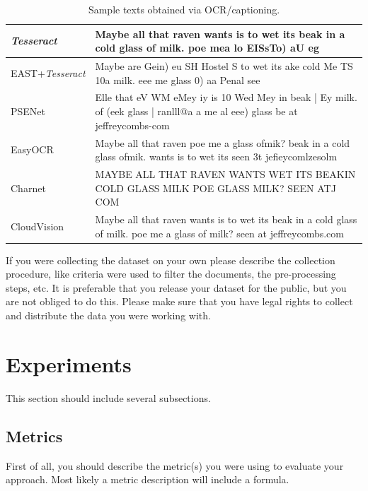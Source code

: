 \documentclass{zapiski}
\begin{document}
\begin{table}[!tbh]\setlength{\tabcolsep}{2pt}
\begin{tabular}{p{.17\linewidth}|p{.79\linewidth}}
\hline
\emph{Tesseract}\newline  \cite{smith2007overview} & 
Maybe all that raven
wants is to wet its
beak in a cold glass of milk.
poe mea lo EISsTo) aU eg
\\\hline
EAST+\newline\emph{Tesseract}\newline\cite{kopeykina2019automatic} & 
Maybe are Gein) eu SH Hostel S to wet its ake cold Me TS 10a milk. eee me glass 0) aa Penal see 
\\\hline
PSENet \newline \cite{wang2019shape} &  Elle that eV WM eMey iy is 10 Wed Mey in beak | Ey milk. of (eek glass | ranlll@a a me al eee) glass be at jeffreycombs-com  \\ \hline
EasyOCR \newline \cite{easyocr} &  Maybe all that raven poe me a glass ofmik? beak in a cold glass ofmik. wants is to wet its seen 3t jefieycomlzesolm  \\ \hline
Charnet \newline \cite{xing2019convolutional} & MAYBE ALL THAT RAVEN WANTS WET ITS BEAKIN COLD GLASS MILK POE GLASS MILK? SEEN ATJ COM 
\\ \hline
CloudVision \newline \cite{otani2018} & Maybe all that raven
wants is to wet its
beak in a cold glass of milk.
poe me a glass of milk?
seen at jeffreycombs.com
 \\\hline
\end{tabular}

\caption{Sample  texts obtained via OCR/captioning.}\label{tab:ocr}
\end{table}

If you were collecting the dataset on your own please describe the collection procedure, like criteria were used to filter the documents, the pre-processing steps, etc. It is preferable that you release your dataset for the public, but you are not obliged to do this. Please make sure that you have legal rights to collect and distribute the data you were working with.

\section{Experiments}
This section should include several subsections.
\subsection{Metrics}
First of all, you should describe the metric(s) you were using to evaluate your approach. Most likely a metric description will include a formula.
\end{document}

